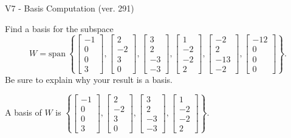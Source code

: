 \begin{exercise}
  \begin{exerciseTitle}V7 - Basis Computation (ver. 291)\end{exerciseTitle}
  \begin{exerciseStatement}
    Find a basis for the subspace 
\[W=\mathrm{span}\ \left\{\left[\begin{array}{r}
-1 \\
0 \\
0 \\
3
\end{array}\right] , \left[\begin{array}{r}
2 \\
-2 \\
3 \\
0
\end{array}\right] , \left[\begin{array}{r}
3 \\
2 \\
-3 \\
-3
\end{array}\right] , \left[\begin{array}{r}
1 \\
-2 \\
-2 \\
2
\end{array}\right] , \left[\begin{array}{r}
-2 \\
2 \\
-13 \\
-2
\end{array}\right] , \left[\begin{array}{r}
-12 \\
0 \\
0 \\
0
\end{array}\right]\right\}.\]
 Be sure to explain why your result is a basis.


  \end{exerciseStatement}
  \begin{exerciseAnswer}
   A basis of \(W\) is  \(\left\{\left[\begin{array}{r}
-1 \\
0 \\
0 \\
3
\end{array}\right] , \left[\begin{array}{r}
2 \\
-2 \\
3 \\
0
\end{array}\right] , \left[\begin{array}{r}
3 \\
2 \\
-3 \\
-3
\end{array}\right] , \left[\begin{array}{r}
1 \\
-2 \\
-2 \\
2
\end{array}\right]\right\}\).
  


  \end{exerciseAnswer}
\end{exercise}